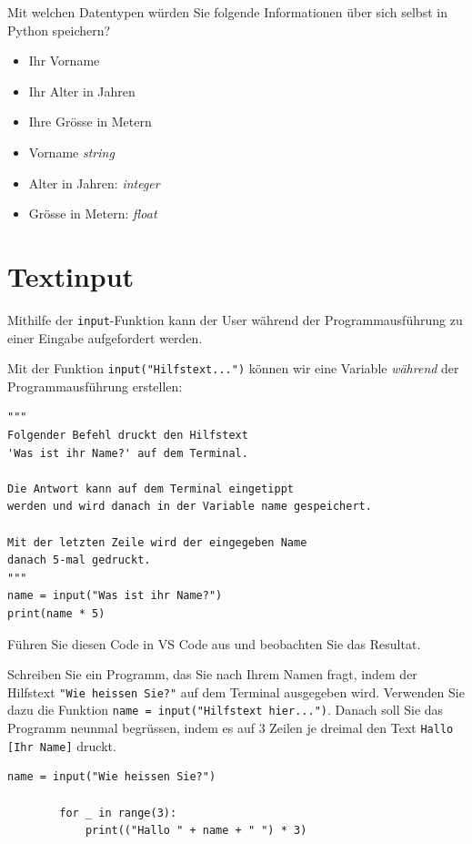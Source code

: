 \begin{myexercise}\label{ex:datatypes}
	Mit welchen Datentypen würden Sie folgende Informationen über sich selbst in Python speichern?
	\begin{itemize}
		\item Ihr Vorname
		\item Ihr Alter in Jahren
		\item Ihre Grösse in Metern
	\end{itemize}
	\begin{myanswer}
		\begin{itemize}
			\item Vorname \emph{string}
			\item Alter in Jahren: \emph{integer}
			\item Grösse in Metern: \emph{float}
		\end{itemize}
	\end{myanswer}
\end{myexercise}

\section{Textinput}
Mithilfe der \lstinline{input}-Funktion kann der User während der Programmausführung zu einer Eingabe aufgefordert werden.
\begin{myexample}\label{ex:input}
Mit der Funktion \lstinline|input("Hilfstext...")| können wir eine Variable \emph{während} der Programmausführung erstellen:

\begin{lstlisting}
""" 
Folgender Befehl druckt den Hilfstext 
'Was ist ihr Name?' auf dem Terminal. 

Die Antwort kann auf dem Terminal eingetippt 
werden und wird danach in der Variable name gespeichert. 

Mit der letzten Zeile wird der eingegeben Name 
danach 5-mal gedruckt.
"""
name = input("Was ist ihr Name?") 
print(name * 5)
\end{lstlisting}

Führen Sie diesen Code in VS Code aus und beobachten Sie das Resultat.
\end{myexample}

\begin{myexercise}\label{ex:name}
	Schreiben Sie ein Programm, das Sie nach Ihrem Namen fragt, indem der Hilfstext \lstinline|"Wie heissen Sie?"| auf dem Terminal ausgegeben wird. Verwenden Sie dazu die Funktion \lstinline|name = input("Hilfstext hier...")|. Danach soll Sie das Programm neunmal begrüssen, indem es auf 3 Zeilen je dreimal den Text \texttt{Hallo [Ihr Name]} druckt.
	\begin{myanswer}
		\begin{lstlisting}[numbers=none]
		name = input("Wie heissen Sie?")
		
		for _ in range(3):
			print(("Hallo " + name + " ") * 3)
	  \end{lstlisting}
	\end{myanswer}
\end{myexercise}

